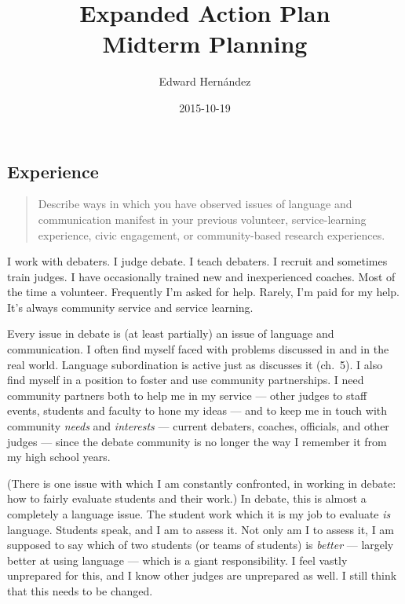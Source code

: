 \documentclass[doc,12pt]{apa6}
\begin{document}
\title{Expanded Action Plan \\ Midterm Planning}
\author{Edward Hern\'{a}ndez}
\date{2015-10-19}
\maketitle


\subsection{Experience}\label{experience}

\begin{quote}
	Describe ways in which you have observed issues of language and
	communication manifest in your previous volunteer, service-learning
	experience, civic engagement, or community-based research experiences.
\end{quote}

I work with debaters. I judge debate. I teach debaters. I recruit and sometimes
train judges. I have occasionally trained new and inexperienced coaches. Most
of the time a volunteer. Frequently I'm asked for help. Rarely, I'm paid for my
help. It's always community service and service learning.

Every issue in debate is (at least partially) an issue of language and
communication. I often find myself faced with problems discussed in
 and  in the real world. Language
subordination is active just as  discusses it (ch.~5). I
also find myself in a position to foster and use community partnerships. I need
community partners both to help me in my service --- other judges to staff
events, students and faculty to hone my ideas --- and to keep me in touch with
community \emph{needs} and \emph{interests} \cite[ch.~2]{Cress13} --- current
debaters, coaches, officials, and other judges --- since the debate community
is no longer the way I remember it from my high school years.

(There is one issue with which I am constantly confronted, in working in
debate: how to fairly evaluate students and their work.) In debate, this is
almost a completely a language issue. The student work which it is my job to
evaluate \emph{is} language. Students speak, and I am to assess it. Not only am
I to assess it, I am supposed to say which of two students (or teams of
students) is \emph{better} --- largely better at using language --- which is a
giant responsibility. I feel vastly unprepared for this, and I know other
judges are unprepared as well. I still think that this needs to be changed.
\end{document}
